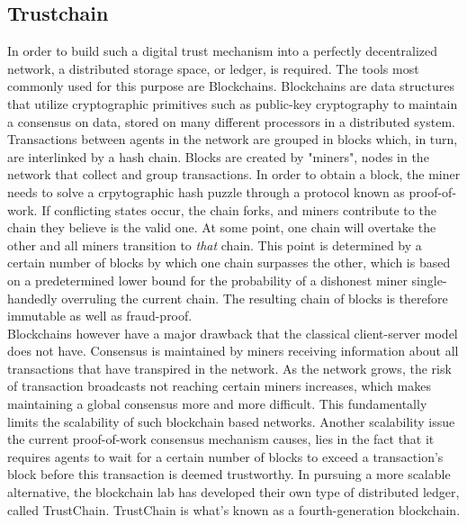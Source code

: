 \documentclass[twocolumn]{article}
\theoremstyle{definition}
\theoremstyle{theorem}
\begin{document}
\subsection{Trustchain}
\label{subsec:Trustchain}
In order to build such a digital trust mechanism into a perfectly decentralized network, a distributed storage space, or ledger, is required. The tools most commonly used for this purpose are Blockchains. Blockchains are data structures that utilize cryptographic primitives such as public-key cryptography to maintain a consensus on data, stored on many different processors in a distributed system. Transactions between agents in the network are grouped in blocks which, in turn, are interlinked by a hash chain. Blocks are created by "miners", nodes in the network that collect and group transactions. In order to obtain a block, the miner needs to solve a crpytographic hash puzzle through a protocol known as proof-of-work. If conflicting states occur, the chain forks, and miners contribute to the chain they believe is the valid one. At some point, one chain will overtake the other and all miners transition to {\it that} chain. This point is determined by a certain number of blocks by which one chain surpasses the other, which is based on a predetermined lower bound for the probability of a dishonest miner single-handedly overruling the current chain. The resulting chain of blocks is therefore immutable as well as fraud-proof\cite{Bitcoin: A peer-to-peer electronic cash system}. \vspace{1em}\\

\noindent Blockchains however have a major drawback that the classical client-server model does not have. Consensus is maintained by miners receiving information about all transactions that have transpired in the network. As the network grows, the risk of transaction broadcasts not reaching certain miners increases, which makes maintaining a global consensus more and more difficult. This fundamentally limits the scalability of such blockchain based networks. Another scalability issue the current proof-of-work consensus mechanism causes, lies in the fact that it requires agents to wait for a certain number of blocks to exceed a transaction's block before this transaction is deemed trustworthy. In pursuing a more scalable alternative, the blockchain lab has developed their own type of distributed ledger, called TrustChain. TrustChain is what's known as a fourth-generation blockchain. \vspace{1em}\\
\end{document}
